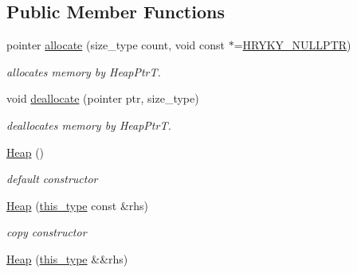 \subsection*{Public Member Functions}
\begin{DoxyCompactItemize}
\item 
\hypertarget{classhryky_1_1allocator_1_1_heap_aa6049d5dcf3b2ec29cc6597d183e80bc}{pointer \hyperlink{classhryky_1_1allocator_1_1_heap_aa6049d5dcf3b2ec29cc6597d183e80bc}{allocate} (size\-\_\-type count, void const $\ast$=\hyperlink{common_8h_a4cd4ac09cfcdbd6b30ee69afc156e210}{H\-R\-Y\-K\-Y\-\_\-\-N\-U\-L\-L\-P\-T\-R})}\label{classhryky_1_1allocator_1_1_heap_aa6049d5dcf3b2ec29cc6597d183e80bc}

\begin{DoxyCompactList}\small\item\em allocates memory by Heap\-Ptr\-T. \end{DoxyCompactList}\item 
\hypertarget{classhryky_1_1allocator_1_1_heap_a60545b7067de7bd142ada1b2ff5bf7f9}{void \hyperlink{classhryky_1_1allocator_1_1_heap_a60545b7067de7bd142ada1b2ff5bf7f9}{deallocate} (pointer ptr, size\-\_\-type)}\label{classhryky_1_1allocator_1_1_heap_a60545b7067de7bd142ada1b2ff5bf7f9}

\begin{DoxyCompactList}\small\item\em deallocates memory by Heap\-Ptr\-T. \end{DoxyCompactList}\item 
\hyperlink{classhryky_1_1allocator_1_1_heap_a6a7972f4ac65c5c1ad631cb0d4db6590}{Heap} ()
\begin{DoxyCompactList}\small\item\em default constructor \end{DoxyCompactList}\item 
\hyperlink{classhryky_1_1allocator_1_1_heap_a8e73ccf19f000b54365cbaf614d2c00d}{Heap} (\hyperlink{classhryky_1_1allocator_1_1_base}{this\-\_\-type} const \&rhs)
\begin{DoxyCompactList}\small\item\em copy constructor \end{DoxyCompactList}\item 
\hypertarget{classhryky_1_1allocator_1_1_heap_a053e81bcd62ee93ba4e9650c55217f29}{\hyperlink{classhryky_1_1allocator_1_1_heap_a053e81bcd62ee93ba4e9650c55217f29}{Heap} (\hyperlink{classhryky_1_1allocator_1_1_base}{this\-\_\-type} \&\&rhs)}\label{classhryky_1_1allocator_1_1_heap_a053e81bcd62ee93ba4e9650c55217f29}


\end{DoxyCompactItemize}
